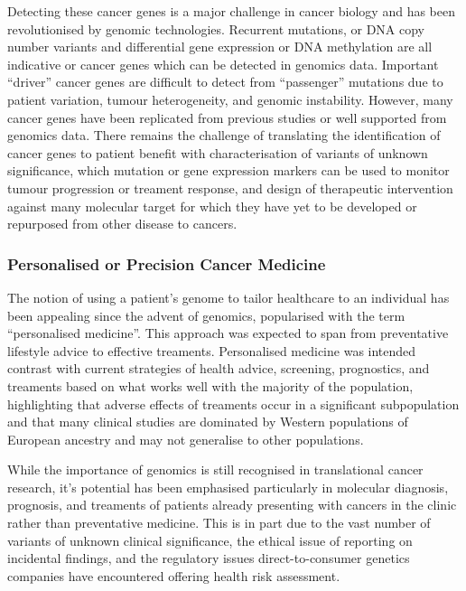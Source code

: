 Detecting these cancer genes is a major challenge in cancer biology and has been revolutionised by genomic technologies. Recurrent mutations, or DNA copy number variants and differential gene expression or DNA methylation are all indicative or cancer genes which can be detected in genomics data. Important ``driver'' cancer genes are difficult to detect from ``passenger'' mutations due to patient variation, tumour heterogeneity, and genomic instability. However, many cancer genes have been replicated from previous studies or well supported from genomics data. There remains the challenge of translating the identification of cancer genes to patient benefit with characterisation of variants of unknown significance, which mutation or gene expression markers can be used to monitor tumour progression or treament response, and design of therapeutic intervention against many molecular target for which they have yet to be developed or repurposed from other disease to cancers. 

\subsubsection{Personalised or Precision Cancer Medicine}
The notion of using a patient's genome to tailor healthcare to an individual has been appealing since the advent of genomics, popularised with the term ``personalised medicine''. This approach was expected to span from preventative lifestyle advice to effective treaments. Personalised medicine was intended contrast with current strategies of health advice, screening, prognostics, and treaments based on what works well with the majority of the population, highlighting that adverse effects of treaments occur in a significant subpopulation and that many clinical studies are dominated by Western populations of European ancestry and may not generalise to other populations.

While the importance of genomics is still recognised in translational cancer research, it's potential has been emphasised particularly in molecular diagnosis, prognosis, and treaments of patients already presenting with cancers in the clinic rather than preventative medicine. This is in part due to the vast number of variants of unknown clinical significance, the ethical issue of reporting on incidental findings, and the regulatory issues direct-to-consumer genetics companies have encountered offering health risk assessment.


